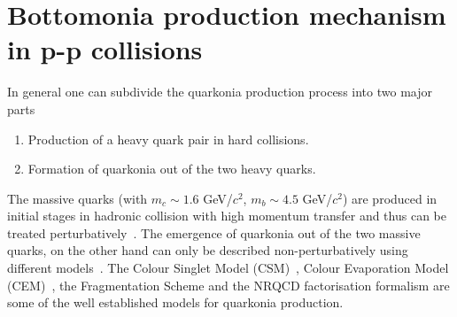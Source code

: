 \section{Bottomonia production mechanism in p-p collisions}
\label{sec:Bottomonia_pp_th}


In general one can subdivide the quarkonia production process into two major parts

\begin{enumerate}
\item Production of a heavy quark pair in hard collisions.
\item Formation of quarkonia out of the two heavy quarks.
\end{enumerate}


The massive quarks (with $m_c\sim 1.6$ GeV/$c^2$, $m_b\sim 4.5$ GeV/$c^2$) are produced
in initial stages in hadronic collision with high momentum transfer and thus
can be treated perturbatively~\cite{Nason:1989zy}. The emergence of quarkonia
out of the two massive quarks, on the other hand can only be described non-perturbatively using different
models~\cite{Bodwin:1994jh,Brambilla:2014jmp}.
The Colour Singlet Model (CSM)~\cite{Einhorn:1975ua,Berger:1980ni},
Colour Evaporation Model (CEM)~\cite{Fritzsch:1977ay,Amundson:1995em}, the Fragmentation Scheme and 
the NRQCD factorisation formalism are some of the well established models for quarkonia production.


